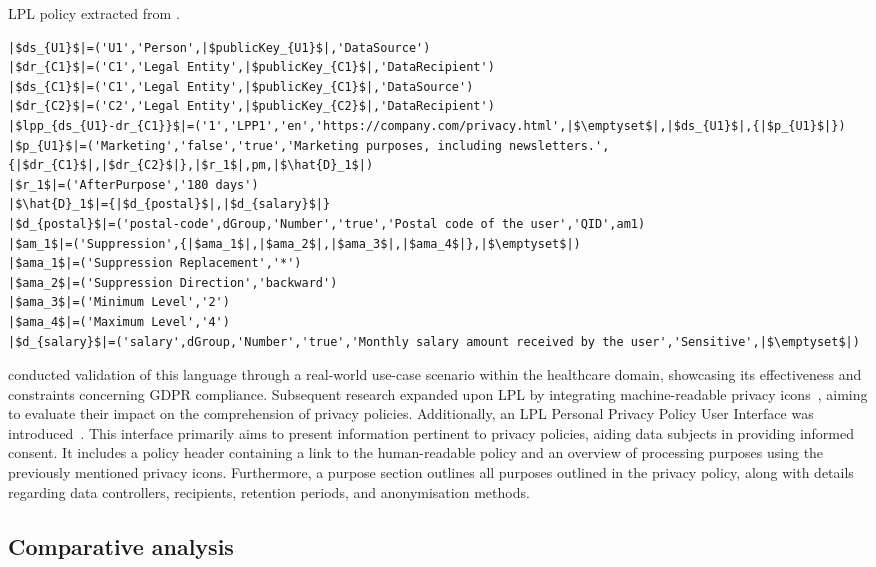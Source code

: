 \begin{listing}[ht]
\caption{LPL policy extracted from \cite{gerl_lpl_2018}.}
\label{list:lpl_example}
\begin{verbatim}
|$ds_{U1}$|=('U1','Person',|$publicKey_{U1}$|,'DataSource')
|$dr_{C1}$|=('C1','Legal Entity',|$publicKey_{C1}$|,'DataRecipient')
|$ds_{C1}$|=('C1','Legal Entity',|$publicKey_{C1}$|,'DataSource')
|$dr_{C2}$|=('C2','Legal Entity',|$publicKey_{C2}$|,'DataRecipient')
|$lpp_{ds_{U1}-dr_{C1}}$|=('1','LPP1','en','https://company.com/privacy.html',|$\emptyset$|,|$ds_{U1}$|,{|$p_{U1}$|})
|$p_{U1}$|=('Marketing','false','true','Marketing purposes, including newsletters.',{|$dr_{C1}$|,|$dr_{C2}$|},|$r_1$|,pm,|$\hat{D}_1$|)
|$r_1$|=('AfterPurpose','180 days')
|$\hat{D}_1$|={|$d_{postal}$|,|$d_{salary}$|}
|$d_{postal}$|=('postal-code',dGroup,'Number','true','Postal code of the user','QID',am1)
|$am_1$|=('Suppression',{|$ama_1$|,|$ama_2$|,|$ama_3$|,|$ama_4$|},|$\emptyset$|)
|$ama_1$|=('Suppression Replacement','*')
|$ama_2$|=('Suppression Direction','backward')
|$ama_3$|=('Minimum Level','2')
|$ama_4$|=('Maximum Level','4')
|$d_{salary}$|=('salary',dGroup,'Number','true','Monthly salary amount received by the user','Sensitive',|$\emptyset$|)
\end{verbatim}
\end{listing}

\cite{gerl_privacy_2019} conducted validation of this language through a real-world use-case scenario within the healthcare domain, showcasing its effectiveness and constraints concerning GDPR compliance.
Subsequent research expanded upon LPL by integrating machine-readable privacy icons~\citep{gerl_extending_2018}, aiming to evaluate their impact on the comprehension of privacy policies.
Additionally, an LPL Personal Privacy Policy User Interface was introduced~\citep{gerl_interface_2018}.
This interface primarily aims to present information pertinent to privacy policies, aiding data subjects in providing informed consent.
It includes a policy header containing a link to the human-readable policy and an overview of processing purposes using the previously mentioned privacy icons.
Furthermore, a purpose section outlines all purposes outlined in the privacy policy, along with details regarding data controllers, recipients, retention periods, and anonymisation methods.

\subsection{Comparative analysis}
\label{sec:sota_policies_analysis}

